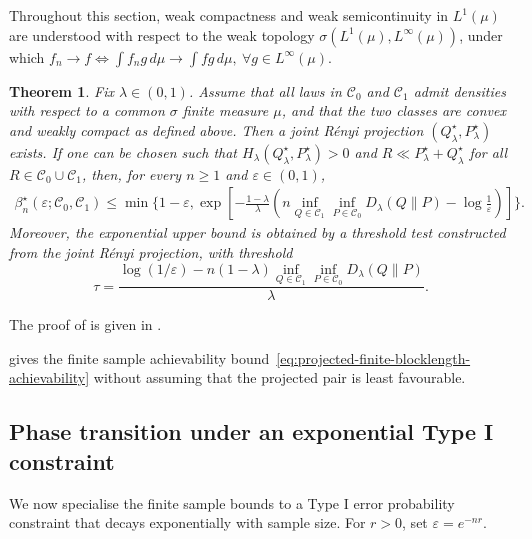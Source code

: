 \documentclass[journal,10pt,draftclsnofoot,onecolumn]{IEEEtran}
\newtheorem{theorem}{Theorem}
\begin{document}
Throughout this section, weak compactness and weak semicontinuity in $L^1(\mu)$ are understood with respect to the weak topology $\sigma(L^1(\mu),L^\infty(\mu))$, under which $f_n\to f \iff \int f_n g\,d\mu\to\int fg\,d\mu, \ \forall g\in L^\infty(\mu)$.

\begin{theorem}
\label{thm:projected-finite-blocklength-achievability}
Fix $\lambda\in(0,1)$. Assume that all laws in $\mathcal C_0$ and $\mathcal C_1$ admit densities with respect to a common $\sigma$ finite measure $\mu$, and that the two classes are convex and weakly compact as defined above. Then a joint R\'enyi projection $(Q_\lambda^\star,P_\lambda^\star)$ exists. If one can be chosen such that $H_\lambda(Q_\lambda^\star,P_\lambda^\star)>0$ and $R\ll P_\lambda^\star+Q_\lambda^\star$ for all $R\in\mathcal C_0\cup\mathcal C_1$, then, for every $n\geq1$ and $\varepsilon\in(0,1)$,
\begin{equation}
\begin{aligned}
\beta_n^\star(\varepsilon;\mathcal C_0,\mathcal C_1)
\leq \min\Bigg\{1-\varepsilon, \exp\left[-\frac{1-\lambda}{\lambda}\left(n\inf_{Q\in\mathcal C_1}\inf_{P\in\mathcal C_0}D_\lambda(Q\|P)-\log\frac{1}{\varepsilon}\right)\right]\Bigg\}.
\end{aligned}
\label{eq:projected-finite-blocklength-achievability}
\end{equation}
Moreover, the exponential upper bound is obtained by a threshold test constructed from the joint R\'enyi projection, with threshold
\begin{equation}
\tau=\frac{\log(1/\varepsilon)-n(1-\lambda)
\inf_{Q\in\mathcal C_1}\inf_{P\in\mathcal C_0}
D_\lambda(Q\|P)}{\lambda}.
\label{eq:proj-threshold}
\end{equation}
\end{theorem}

The proof of  is given in .

 gives the finite sample achievability bound~\eqref{eq:projected-finite-blocklength-achievability} without assuming that the projected pair is least favourable. 

\subsection{Phase transition under an exponential Type I constraint}
\label{subsec:threshold-rate}
We now specialise the finite sample bounds to a Type I error probability constraint that decays exponentially with sample size. For $r>0$, set $\varepsilon=e^{-nr}.$
\end{document}
